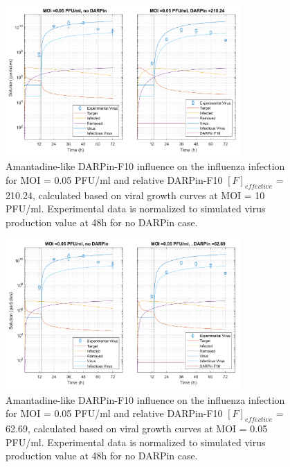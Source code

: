 \begin{figure}
\begin{center}
\includegraphics[width=0.8\textwidth, trim={0cm 0cm 0cm 0cm}, clip]{D_chapters/3_DARPinModels/2_DARPinInfection/comparisonModelTHillIRVViDelayMOI0.072135DARPin210.236AsymmetricDarpinMyosinInhibitor.pdf}
\caption[Amantadine-like DARPin-F10 for MOI = 0.05 PFU/ml and $F_{effective}$ = 210.24]{Amantadine-like DARPin-F10 influence on the influenza infection for MOI = 0.05 PFU/ml and relative DARPin-F10 $[F]_{effective}$ = 210.24, calculated based on viral growth curves at MOI = 10 PFU/ml. Experimental data is normalized to simulated virus production value at 48h for no DARPin case.}
\label{figure:amantadineLikeF210}
\end{center}
\end{figure}

\begin{figure}
\begin{center}
\includegraphics[width=0.8\textwidth, trim={0cm 0cm 0cm 0cm}, clip]{D_chapters/3_DARPinModels/2_DARPinInfection/comparisonModelTHillIRVViDelayMOI0.072135DARPin62.6898AsymmetricDarpinMyosinInhibitor.pdf}
\caption[Amantadine-like DARPin-F10 for MOI = 0.05 PFU/ml and $F_{effective}$ = 62.69]{Amantadine-like DARPin-F10 influence on the influenza infection for MOI = 0.05 PFU/ml and relative DARPin-F10 $[F]_{effective}$ = 62.69, calculated based on viral growth curves at MOI = 0.05 PFU/ml. Experimental data is normalized to simulated virus production value at 48h for no DARPin case.}
\label{figure:amantadineLikeF62}
\end{center}
\end{figure}

